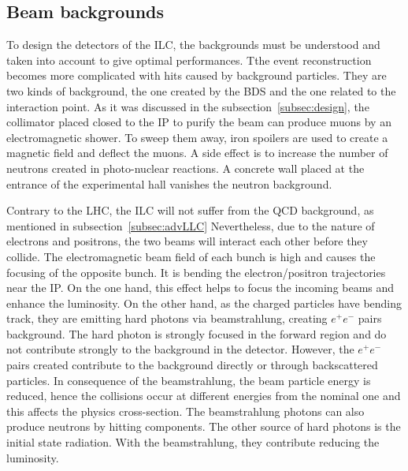     \subsection{Beam backgrounds}

    To design the detectors of the \gls{ILC}, the backgrounds must be understood and taken into account to give optimal performances.
    Tthe event reconstruction becomes more complicated with hits caused by background particles.
    They are two kinds of background, the one created by the \gls{BDS} and the one related to the interaction point.
    As it was discussed in the subsection~\ref{subsec:design}, the collimator placed closed to the \gls{IP} to purify the beam can produce muons by an electromagnetic shower.
    To sweep them away, iron spoilers are used to create a magnetic field and deflect the muons.
    A side effect is to increase the number of neutrons created in photo-nuclear reactions.
    A concrete wall placed at the entrance of the experimental hall vanishes the neutron background.

    Contrary to the \gls{LHC}, the \gls{ILC} will not suffer from the QCD background, as mentioned in subsection~\ref{subsec:advLLC}
    Nevertheless, due to the nature of electrons and positrons, the two beams will interact each other before they collide.
    The electromagnetic beam field of each bunch is high and causes the focusing of the opposite bunch.
    It is bending the electron/positron trajectories near the \gls{IP}.
    On the one hand, this effect helps to focus the incoming beams and enhance the luminosity.
    On the other hand, as the charged particles have bending track, they are emitting hard photons via beamstrahlung, creating $e^+e^-$ pairs background.
    The hard photon is strongly focused in the forward region and do not contribute strongly to the background in the detector.
    However, the $e^+e^-$ pairs created contribute to the background directly or through backscattered particles.
    In consequence of the beamstrahlung, the beam particle energy is reduced, hence the collisions occur at different energies from the nominal one and this affects the physics cross-section.
    The beamstrahlung photons can also produce neutrons by hitting components.
    The other source of hard photons is the initial state radiation. 
    With the beamstrahlung, they contribute reducing the luminosity\cite{Markin2014}.

